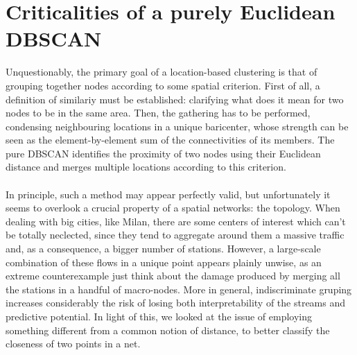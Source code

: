 \documentclass[11pt,twoside]{report}
\begin{document}
\section{Criticalities of a purely Euclidean DBSCAN}
Unquestionably, the primary goal of a location-based clustering is that of grouping  together nodes according to some spatial criterion. First of all, a definition of similariy must be established: clarifying what does it mean for two nodes to be in the same area. Then, the gathering has to be performed, condensing neighbouring locations in a unique baricenter, whose strength can be seen as the element-by-element sum of the connectivities of its members. The pure DBSCAN identifies the proximity of two nodes using their Euclidean distance and merges multiple locations according to this criterion.\\
\\
In principle, such a method may appear perfectly valid, but unfortunately it seems to overlook a crucial property of a spatial networks: the topology. When dealing with big cities, like Milan, there are some centers of interest which can't be totally neclected, since they tend to aggregate around them a massive traffic and, as a consequence, a bigger number of stations. However, a large-scale combination of these flows in a unique point appears plainly unwise, as an extreme counterexample just think about the damage produced by merging all the stations in a handful of macro-nodes. More in general, indiscriminate gruping increases considerably the risk of losing both interpretability of the streams and predictive potential. In light of this, we looked at the issue of employing something different from a common notion of distance, to better classify the closeness of two points in a net.\\
\\
\end{document}
